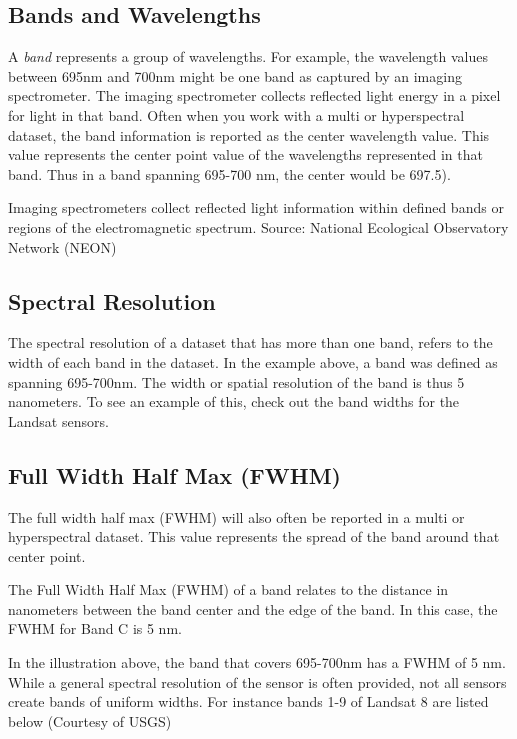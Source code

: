 \documentclass[]{book}
\begin{document}
\hypertarget{bands-and-wavelengths}{%
\subsection{Bands and Wavelengths}\label{bands-and-wavelengths}}

A \emph{band} represents a group of wavelengths. For example, the wavelength values
between 695nm and 700nm might be one band as captured by an imaging spectrometer.
The imaging spectrometer collects reflected light energy in a pixel for light
in that band. Often when you work with a multi or hyperspectral dataset, the
band information is reported as the center wavelength value. This value
represents the center point value of the wavelengths represented in that band.
Thus in a band spanning 695-700 nm, the center would be 697.5).

Imaging spectrometers collect reflected light information within
defined bands or regions of the electromagnetic spectrum. Source: National
Ecological Observatory Network (NEON)

\hypertarget{spectral-resolution}{%
\subsection{Spectral Resolution}\label{spectral-resolution}}

The spectral resolution of a dataset that has more than one band, refers to the
width of each band in the dataset. In the example above, a band was defined as
spanning 695-700nm. The width or spatial resolution of the band is thus 5
nanometers. To see an example of this, check out the band widths for the
Landsat sensors.

\hypertarget{full-width-half-max-fwhm}{%
\subsection{Full Width Half Max (FWHM)}\label{full-width-half-max-fwhm}}

The full width half max (FWHM) will also often be reported in a multi or
hyperspectral dataset. This value represents the spread of the band around that
center point.

The Full Width Half Max (FWHM) of a band relates to the distance
in nanometers between the band center and the edge of the band. In this
case, the FWHM for Band C is 5 nm.

In the illustration above, the band that covers 695-700nm has a FWHM of 5 nm.
While a general spectral resolution of the sensor is often provided, not all
sensors create bands of uniform widths. For instance bands 1-9 of Landsat 8 are
listed below (Courtesy of USGS)
\end{document}
